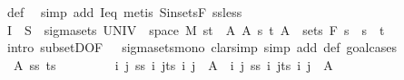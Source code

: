 \begin{isabellebody}
\ {\isasymSS}{\isacharunderscore}{\kern0pt}def\ \isamarkupfalse%
\ {\isacharparenleft}{\kern0pt}simp\ add{\isacharcolon}{\kern0pt}\ I{\isacharunderscore}{\kern0pt}eq{\isacharcomma}{\kern0pt}\ metis\ S{\isacharunderscore}{\kern0pt}in{\isacharunderscore}{\kern0pt}sets{\isacharunderscore}{\kern0pt}F\ ss{\isacharunderscore}{\kern0pt}less{\isacharparenright}{\kern0pt}\isanewline
\ \ \ \ \isamarkupfalse%
\ {\isachardoublequoteopen}I\ {\isasymtimes}\ S\ {\isasymin}\ sigma{\isacharunderscore}{\kern0pt}sets\ {\isacharparenleft}{\kern0pt}UNIV\ {\isasymtimes}\ space\ M{\isacharparenright}{\kern0pt}\ {\isacharparenleft}{\kern0pt}{\isacharbraceleft}{\kern0pt}{\isacharbraceleft}{\kern0pt}s{\isacharless}{\kern0pt}{\isachardot}{\kern0pt}{\isachardot}{\kern0pt}t{\isacharbraceright}{\kern0pt}\ {\isasymtimes}\ A\ {\isacharbar}{\kern0pt}A\ s\ t{\isachardot}{\kern0pt}\ A\ {\isasymin}\ sets\ {\isacharparenleft}{\kern0pt}F\ s{\isacharparenright}{\kern0pt}\ {\isasymand}\ s\ {\isacharless}{\kern0pt}\ t{\isacharbraceright}{\kern0pt}{\isacharparenright}{\kern0pt}{\isachardoublequoteclose}\isanewline
\ \ \ \ \isamarkupfalse%
\ {\isacharparenleft}{\kern0pt}intro\ subsetD{\isacharbrackleft}{\kern0pt}OF\ {\isacharunderscore}{\kern0pt}\ {\isacharasterisk}{\kern0pt}{\isacharasterisk}{\kern0pt}{\isacharbrackright}{\kern0pt}\ sigma{\isacharunderscore}{\kern0pt}sets{\isacharunderscore}{\kern0pt}mono{\isacharcomma}{\kern0pt}\ clarsimp\ simp\ add{\isacharcolon}{\kern0pt}\ {\isasymSS}{\isacharunderscore}{\kern0pt}def{\isacharcomma}{\kern0pt}\ goal{\isacharunderscore}{\kern0pt}cases{\isacharparenright}{\kern0pt}\isanewline
\ \ \ \ \ \ \isamarkupfalse%
\ {\isacharparenleft}{\kern0pt}{}\ A\ ss\ ts{\isacharparenright}{\kern0pt}\isanewline
\ \ \ \ \ \ \isamarkupfalse%
\ {\isacharasterisk}{\kern0pt}{\isacharcolon}{\kern0pt}\ {\isachardoublequoteopen}{\isacharparenleft}{\kern0pt}{\isasymUnion}i{\isachardot}{\kern0pt}\ {\isasymInter}j{\isachardot}{\kern0pt}\ {\isacharbraceleft}{\kern0pt}ss\ i\ j{\isacharless}{\kern0pt}{\isachardot}{\kern0pt}{\isachardot}{\kern0pt}ts\ i\ j{\isacharbraceright}{\kern0pt}{\isacharparenright}{\kern0pt}\ {\isasymtimes}\ A\ {\isacharequal}{\kern0pt}\ {\isacharparenleft}{\kern0pt}{\isasymUnion}i{\isachardot}{\kern0pt}\ {\isasymInter}j{\isachardot}{\kern0pt}\ {\isacharbraceleft}{\kern0pt}ss\ i\ j{\isacharless}{\kern0pt}{\isachardot}{\kern0pt}{\isachardot}{\kern0pt}ts\ i\ j{\isacharbraceright}{\kern0pt}\ {\isasymtimes}\ A{\isacharparenright}{\kern0pt}{\isachardoublequoteclose}\ \isamarkupfalse%

\end{isabellebody}
